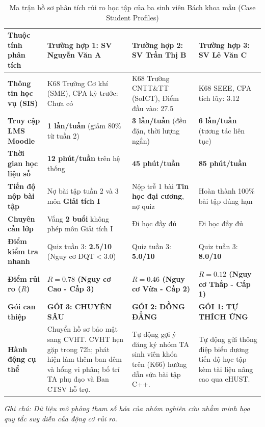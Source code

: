\begin{table}[htbp]
\centering
\caption{Ma trận hồ sơ phân tích rủi ro học tập của ba sinh viên Bách khoa mẫu (Case Student Profiles)}
\label{tab:case_profiles}
\vspace{0.2cm}
\fontsize{8}{10}\selectfont
\begin{tabularx}{\textwidth}{|L{2.8cm}|Y|Y|Y|}
\hline
\textbf{Thuộc tính phân tích} & \textbf{Trường hợp 1: SV Nguyễn Văn A} & \textbf{Trường hợp 2: SV Trần Thị B} & \textbf{Trường hợp 3: SV Lê Văn C} \\
\hline
\textbf{Thông tin học vụ (SIS)} & K68 Trường Cơ khí (SME), CPA kỳ trước: Chưa có & K68 Trường CNTT\&TT (SoICT), Điểm đầu vào: 27.5 & K68 SEEE, CPA tích lũy: 3.12 \\
\hline
\textbf{Truy cập LMS Moodle} & \textbf{1 lần/tuần} (giảm 80\% từ tuần 2) & \textbf{3 lần/tuần} (đều đặn, thời lượng ngắn) & \textbf{6 lần/tuần} (tương tác liên tục) \\
\hline
\textbf{Thời gian học liệu số} & \textbf{12 phút/tuần} trên hệ thống & \textbf{45 phút/tuần} & \textbf{85 phút/tuần} \\
\hline
\textbf{Tiến độ nộp bài tập} & Nợ bài tập tuần 2 và 3 môn \textbf{Giải tích I} & Nộp trễ 1 bài \textbf{Tin học đại cương}, nợ quiz & Hoàn thành 100\% bài tập đúng hạn \\
\hline
\textbf{Chuyên cần lớp} & Vắng \textbf{2 buổi} không phép môn Giải tích I & Đi học đầy đủ & Đi học đầy đủ \\
\hline
\textbf{Điểm kiểm tra nhanh} & Quiz tuần 3: \textbf{2.5/10} (Nguy cơ $\text{ĐQT} < 3.0$) & Quiz tuần 3: \textbf{5.0/10} & Quiz tuần 3: \textbf{8.0/10} \\
\hline
\textbf{Điểm rủi ro ($R$)} & \textbf{$R = 0.78$ (Nguy cơ Cao - Cấp 3)} & \textbf{$R = 0.46$ (Nguy cơ Vừa - Cấp 2)} & \textbf{$R = 0.12$ (Nguy cơ Thấp - Cấp 1)} \\
\hline
\textbf{Gói can thiệp} & \textbf{GÓI 3: CHUYÊN SÂU} & \textbf{GÓI 2: ĐỒNG ĐẲNG} & \textbf{GÓI 1: TỰ THÍCH ỨNG} \\
\hline
\textbf{Hành động cụ thể} & Chuyển hồ sơ bảo mật sang CVHT. CVHT hẹn gặp trong 72h; phát hiện làm thêm ban đêm và hổng vi phân; bố trí TA phụ đạo và Ban CTSV hỗ trợ. & Tự động gợi ý đăng ký nhóm TA sinh viên khóa trên (K66) hướng dẫn sửa bài tập C++. & Tự động gửi thông điệp biểu dương tiến độ học tập kèm tài liệu nâng cao qua eHUST. \\
\hline
\end{tabularx}
\begin{flushleft}
\textit{\fontsize{8}{9.5}\selectfont Ghi chú: Dữ liệu mô phỏng tham số hóa của nhóm nghiên cứu nhằm minh họa quy tắc suy diễn của động cơ rủi ro.}
\end{flushleft}
\end{table}

